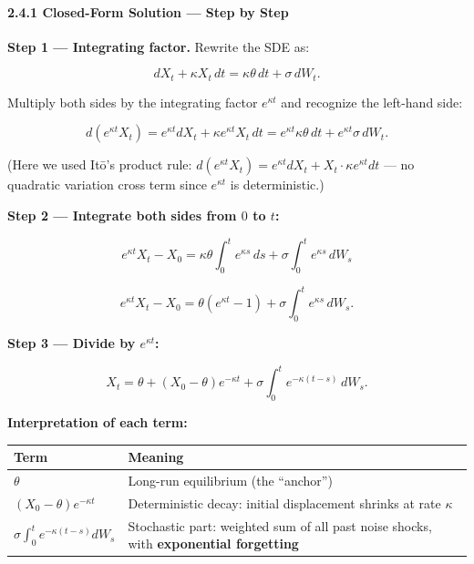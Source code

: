 \documentclass[11pt,a4paper]{article}
\begin{document}
\paragraph{2.4.1 Closed-Form Solution --- Step by Step}\label{closed-form-solution-step-by-step}

\textbf{Step 1 --- Integrating factor.} Rewrite the SDE as:

\[dX_t + \kappa X_t\,dt = \kappa\theta\,dt + \sigma\,dW_t.\]

Multiply both sides by the integrating factor \(e^{\kappa t}\) and recognize the left-hand side:

\[d\!\left(e^{\kappa t}X_t\right) = e^{\kappa t}dX_t + \kappa e^{\kappa t}X_t\,dt = e^{\kappa t}\kappa\theta\,dt + e^{\kappa t}\sigma\,dW_t.\]

(Here we used Itō's product rule: \(d(e^{\kappa t}X_t) = e^{\kappa t}dX_t + X_t\cdot\kappa e^{\kappa t}dt\) --- no quadratic variation cross term since \(e^{\kappa t}\) is deterministic.)

\textbf{Step 2 --- Integrate both sides from \(0\) to \(t\):}

\[e^{\kappa t}X_t - X_0 = \kappa\theta\int_0^t e^{\kappa s}\,ds + \sigma\int_0^t e^{\kappa s}\,dW_s\]

\[e^{\kappa t}X_t - X_0 = \theta(e^{\kappa t} - 1) + \sigma\int_0^t e^{\kappa s}\,dW_s.\]

\textbf{Step 3 --- Divide by \(e^{\kappa t}\):}

\[\boxed{X_t = \theta + (X_0 - \theta)e^{-\kappa t} + \sigma\int_0^t e^{-\kappa(t-s)}\,dW_s.}\]

\textbf{Interpretation of each term:}

{\def\LTcaptype{none} %
\begin{longtable}[]{@{}
  >{\raggedright\arraybackslash}p{}
  >{\raggedright\arraybackslash}p{}@{}}
\toprule\noalign{}
\begin{minipage}[b]{\linewidth}\raggedright
Term
\end{minipage} & \begin{minipage}[b]{\linewidth}\raggedright
Meaning
\end{minipage} \\
\midrule\noalign{}
\endhead
\bottomrule\noalign{}
\endlastfoot
\(\theta\) & Long-run equilibrium (the ``anchor'') \\
\((X_0-\theta)e^{-\kappa t}\) & Deterministic decay: initial displacement shrinks at rate \(\kappa\) \\
\(\sigma\int_0^t e^{-\kappa(t-s)}dW_s\) & Stochastic part: weighted sum of all past noise shocks, with \textbf{exponential forgetting} \\
\end{longtable}
}
\end{document}
